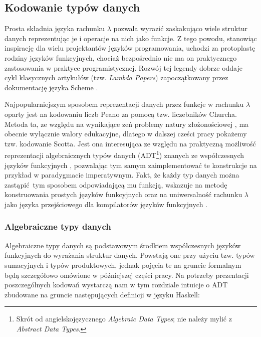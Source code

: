   \subsection{Kodowanie typów danych}
Prosta składnia języka rachunku \(\lambda\) pozwala wyrazić zaskakująco wiele struktur danych reprezentując je i operacje na nich jako funkcje. Z tego powodu, stanowiąc inspirację dla wielu projektantów języków programowania, uchodzi za protoplastę rodziny języków funkcyjnych, chociaż bezpośrednio nie ma on praktycznego zastosowania w praktyce programistycznej. Rozwój tej legendy dobrze oddaje cykl klasycznych artykułów (tzw. \emph{Lambda Papers}) zapoczątkowany przez dokumentację języka Scheme \cite{Sussman:1975:IEL:889230}.

Najpopularniejszym sposobem reprezentacji danych przez funkcje w rachunku \(\lambda\) oparty jest na kodowaniu liczb Peano za pomocą tzw. liczebników Churcha. Metoda ta, ze względu na wynikające zeń problemy natury złożonościowej \cite{Koopman:2014:CED:2746325.2746330}, ma obecnie wyłącznie walory edukacyjne, dlatego w dalszej cześci pracy pokażemy tzw. kodowanie Scotta. Jest ona interesująca ze względu na praktyczną możliwość reprezentacji algebraicznych typów danych (ADT\footnote{Skrót od angielskojęzycznego \emph{Algebraic Data Types}; nie należy mylić z \emph{Abstract Data Types}.}) znanych ze współczesnych języków funkcyjnych \cite{Jansen:2013:P9C:2941698.2941710}, pozwalając tym samym zaimplementować te konstrukcje na przykład w paradygmacie imperatywnym. Fakt, że każdy typ danych można zastąpić tym sposobem odpowiadającą mu funkcją, wskazuje na metodę konstruowania prostych języków funkcyjnych \cite{Jensen_2006} oraz na uniwersalność rachunku \(\lambda\) jako języka przejściowego dla kompilatorów języków funkcyjnych \cite[Rozdział 3]{PeytonJones:1992:IFL:129390}.

\subsubsection{Algebraiczne typy danych}
Algebraiczne typy danych są podstawowym środkiem współczesnych języków funkcyjnych do wyrażania struktur danych. Powstają one przy użyciu tzw. typów sumacyjnych i typów produktowych, jednak pojęcia te na gruncie formalnym będą szczegółowo omówione w późniejszej części pracy. Na potrzeby prezentacji poszczególnych kodowań wystarczą nam w tym rozdziale intuicje o ADT zbudowane na gruncie następujących definicji w języku Haskell:

